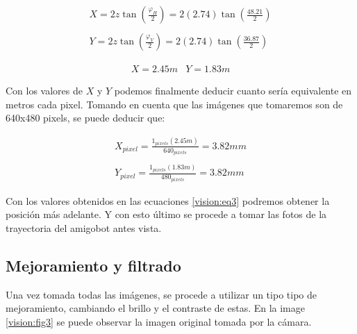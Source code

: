 \documentclass[spanish,10pt,letterpaper, twocolumn]{article}
\begin{document}
\begin{equation}
	\begin{matrix}
		X=2z\tan\left(\frac{\varphi_H}{2}\right)=2(2.74)\tan\left(\frac{48.21}{2} \right)   \\ \\
		Y=2z\tan\left(\frac{\varphi_V}{2}  \right)=2(2.74)\tan\left(\frac{36.87}{2} \right)  
	\end{matrix}
\end{equation}

\begin{equation}
	\begin{matrix}
		X=2.45m & Y=1.83m
	\end{matrix}
\end{equation}

Con los valores de $X$ y $Y$ podemos finalmente deducir cuanto ser\'ia equivalente en metros cada pixel. Tomando en cuenta que las im\'agenes que tomaremos son de 640x480 pixels, se puede deducir que:

\begin{equation}
	\label{vision:eq3}
	\begin{matrix}
		X_{pixel}=\frac{1_{pixels}(2.45m)}{640_{pixels}}=3.82mm \\ \\
		Y_{pixel}=\frac{1_{pixels}(1.83m)}{480_{pixels}}=3.82mm
	\end{matrix}
\end{equation}

Con los valores obtenidos en las ecuaciones \eqref{vision:eq3} podremos obtener la posici\'on m\'as adelante. Y con esto \'ultimo se procede a tomar las fotos de la trayectoria del amigobot antes vista.




\subsection{Mejoramiento y filtrado}
Una vez tomada todas las im\'agenes, se procede a utilizar un tipo tipo de mejoramiento, cambiando el brillo y el contraste de estas. En la image \ref{vision:fig3} se puede observar la imagen original tomada por la c\'amara.
\end{document}

